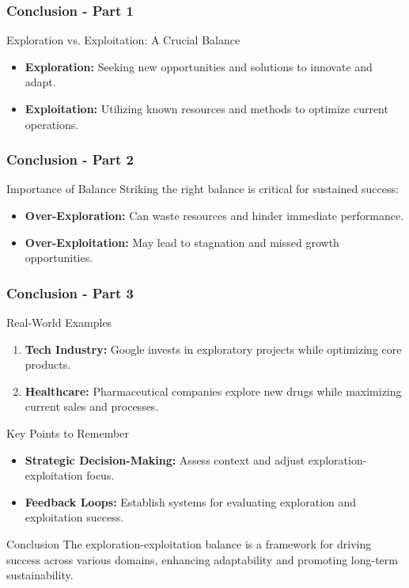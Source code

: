\documentclass[aspectratio=169]{beamer}
\begin{document}
\begin{frame}[fragile]
  \frametitle{Conclusion - Part 1}

  \begin{block}{Exploration vs. Exploitation: A Crucial Balance}
    \begin{itemize}
      \item \textbf{Exploration:} Seeking new opportunities and solutions to innovate and adapt.
      \item \textbf{Exploitation:} Utilizing known resources and methods to optimize current operations.
    \end{itemize}
  \end{block}
\end{frame}

\begin{frame}[fragile]
  \frametitle{Conclusion - Part 2}

  \begin{block}{Importance of Balance}
    Striking the right balance is critical for sustained success:
    \begin{itemize}
      \item \textbf{Over-Exploration:} Can waste resources and hinder immediate performance.
      \item \textbf{Over-Exploitation:} May lead to stagnation and missed growth opportunities.
    \end{itemize}
  \end{block}
\end{frame}

\begin{frame}[fragile]
  \frametitle{Conclusion - Part 3}

  \begin{block}{Real-World Examples}
    \begin{enumerate}
      \item \textbf{Tech Industry:} Google invests in exploratory projects while optimizing core products.
      \item \textbf{Healthcare:} Pharmaceutical companies explore new drugs while maximizing current sales and processes.
    \end{enumerate}
  \end{block}

  \begin{block}{Key Points to Remember}
    \begin{itemize}
      \item \textbf{Strategic Decision-Making:} Assess context and adjust exploration-exploitation focus.
      \item \textbf{Feedback Loops:} Establish systems for evaluating exploration and exploitation success.
    \end{itemize}
  \end{block}

  \begin{block}{Conclusion}
    The exploration-exploitation balance is a framework for driving success across various domains, enhancing adaptability and promoting long-term sustainability.
  \end{block}
\end{frame}
\end{document}
